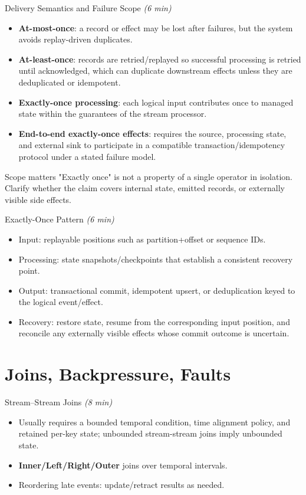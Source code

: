 \documentclass[aspectratio=169,11pt]{beamer}
\newcommand{\term}[1]{\textbf{#1}}
\newcommand{\mins}[1]{\textit{(#1 min)}}
\begin{document}
\begin{frame}{Delivery Semantics and Failure Scope \mins{6}}
  \begin{itemize}
    \item \term{At-most-once}: a record or effect may be lost after failures, but the system avoids replay-driven duplicates.
    \item \term{At-least-once}: records are retried/replayed so successful processing is retried until acknowledged, which can duplicate downstream effects unless they are deduplicated or idempotent.
    \item \term{Exactly-once processing}: each logical input contributes once to managed state within the guarantees of the stream processor.
    \item \term{End-to-end exactly-once effects}: requires the source, processing state, and external sink to participate in a compatible transaction/idempotency protocol under a stated failure model.
  \end{itemize}

  \begin{alertbox}{Scope matters}
    "Exactly once" is not a property of a single operator in isolation. Clarify whether the claim covers internal state, emitted records, or externally visible side effects.
  \end{alertbox}
\end{frame}

\begin{frame}{Exactly-Once Pattern \mins{6}}
\begin{itemize}
  \item Input: replayable positions such as partition+offset or sequence IDs.
  \item Processing: state snapshots/checkpoints that establish a consistent recovery point.
  \item Output: transactional commit, idempotent upsert, or deduplication keyed to the logical event/effect.
  \item Recovery: restore state, resume from the corresponding input position, and reconcile any externally visible effects whose commit outcome is uncertain.
\end{itemize}
\end{frame}

\section{Joins, Backpressure, Faults}
\begin{frame}{Stream–Stream Joins \mins{8}}
  \begin{itemize}
    \item Usually requires a bounded temporal condition, time alignment policy, and retained per-key state; unbounded stream-stream joins imply unbounded state.
    \item \term{Inner/Left/Right/Outer} joins over temporal intervals.
    \item Reordering late events: update/retract results as needed.
  \end{itemize}
\end{frame}
\end{document}
